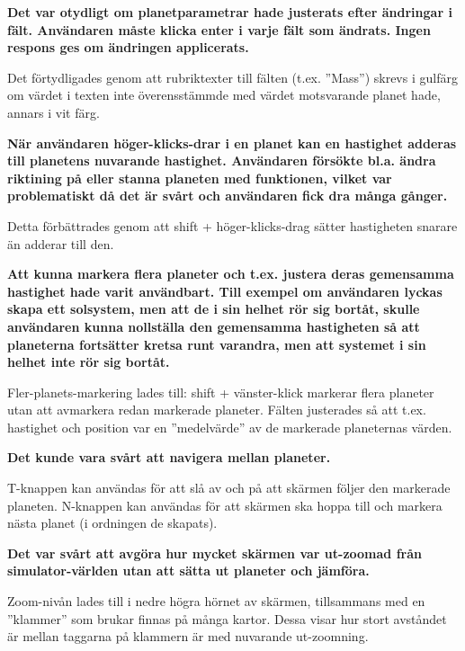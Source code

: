 \vspace{6pt}

\textbf{Det var otydligt om planetparametrar hade justerats efter ändringar i
fält. Användaren måste klicka enter i varje fält som ändrats.
Ingen respons ges om ändringen applicerats.}

Det förtydligades genom att rubriktexter till fälten (t.ex. ''Mass'')
skrevs i gulfärg om värdet i texten inte överensstämmde med värdet
motsvarande planet hade, annars i vit färg.

\vspace{6pt}

\textbf{När användaren höger-klicks-drar i en planet kan en hastighet
adderas till planetens nuvarande hastighet.
Användaren försökte bl.a. ändra riktining på eller stanna planeten
med funktionen, vilket var problematiskt då det är svårt och
användaren fick dra många gånger.}

Detta förbättrades genom att shift + höger-klicks-drag sätter hastigheten
snarare än adderar till den.

\vspace{6pt}

\textbf{Att kunna markera flera planeter och t.ex. justera deras gemensamma
hastighet hade varit användbart. Till exempel om användaren lyckas
skapa ett solsystem, men att de i sin helhet rör sig bortåt, skulle
användaren kunna nollställa den gemensamma hastigheten så att planeterna
fortsätter kretsa runt varandra, men att systemet i sin helhet inte rör
sig bortåt.}

Fler-planets-markering lades till: shift + vänster-klick markerar flera
planeter utan att avmarkera redan markerade planeter.
Fälten justerades så att t.ex. hastighet och position var en ''medelvärde''
av de markerade planeternas värden.


\vspace{6pt}

\textbf{Det kunde vara svårt att navigera mellan planeter.}

T-knappen kan användas för att slå av och på att skärmen följer
den markerade planeten. N-knappen kan användas för att skärmen
ska hoppa till och markera nästa planet (i ordningen de skapats).

\vspace{6pt}

\textbf{Det var svårt att avgöra hur mycket skärmen var ut-zoomad från
simulator-världen utan att sätta ut planeter och jämföra.}

Zoom-nivån lades till i nedre högra hörnet av skärmen, tillsammans
med en ''klammer'' som brukar finnas på många kartor.
Dessa visar hur stort avståndet är mellan taggarna på klammern är med
nuvarande ut-zoomning.


